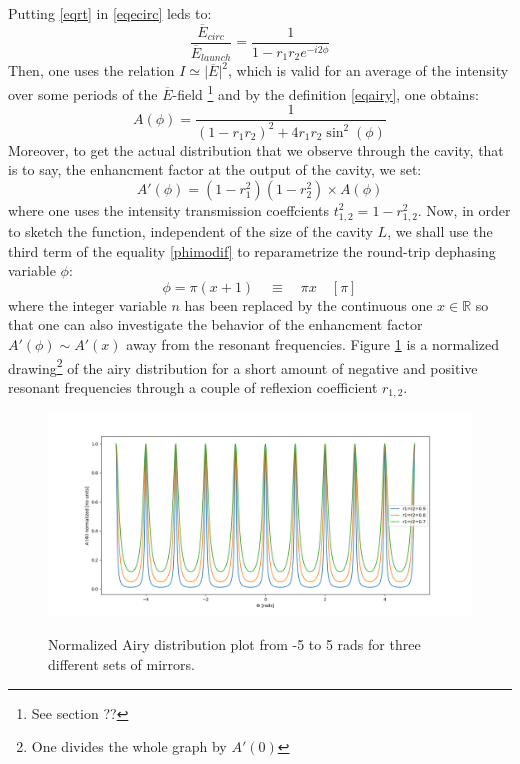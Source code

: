 \documentclass[10pt]{report}
\begin{document}
Putting \eqref{eqrt} in \eqref{eqecirc} leds to:
\begin{equation}
\frac{\overline{E}_{circ}}{\overline{E}_{launch}} = \frac{1}{1 - r_1 r_2 e^{-i2\phi}}
\end{equation}
Then, one uses the relation $ I \simeq \vert\overline{E}\vert^2$, which is valid for an average of the intensity over some periods of the $\overline{E}$-field \footnote{See section ??} and by the definition \eqref{eqairy}, one obtains:
\begin{equation}
\label{airyformula}
A(\phi) = \frac{1}{(1 - r_1 r_2)^2 + 4 r_1 r_2 \sin^2(\phi)}
\end{equation}
Moreover, to get the actual distribution that we observe through the cavity, that is to say, the enhancment factor at the output of the cavity, we set:
\begin{equation}
\label{airyformulasec}
A'(\phi) = (1-r_1^2)(1-r_2^2)\times A(\phi)
\end{equation}
where one uses the intensity transmission coeffcients $t_{1,2}^2 = 1-r_{1,2}^2$. Now, in order to sketch the function, independent of the size of the cavity $L$, we shall use the third term of the equality \eqref{phimodif} to reparametrize the round-trip dephasing variable $\phi$:
\begin{equation}
\label{phidef}
\phi = \pi(x+1) \quad \equiv \quad \pi x \quad [\pi]
\end{equation}
where the integer variable $n$ has been replaced by the continuous one $x \in \mathbb{R}$ so that one can also investigate the behavior of the enhancment factor $A'(\phi) \sim A'(x)$ away from the resonant frequencies. Figure \ref{fig:airy-dist} is a normalized drawing\footnote{One divides the whole graph by $A'(0)$} of the airy distribution for a short amount of negative and positive resonant frequencies through a couple of reflexion coefficient $r_{1,2}$. 

\begin{figure}[h]
\caption{Normalized Airy distribution plot from -5 to 5 rads for three different sets of mirrors.}
\centering
\includegraphics[width=\textwidth]{airy-dist}
\label{fig:airy-dist}
\end{figure}
\end{document}
